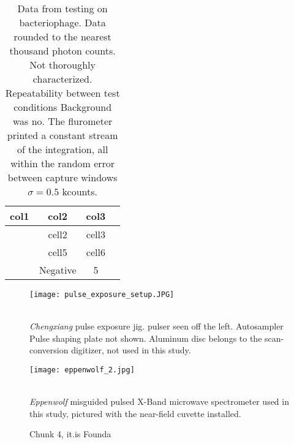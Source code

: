\documentclass[fleqn,10pt]{article}
\begin{document}



\begin{table}[h!]
	\centering
	\begin{tabular}{ |c|c|c|c| } 
		\hline
		col1 & col2 & col3 \\
		\hline
		& cell2 & cell3 \\ 
		& cell5 & cell6 \\ 
		& Negative & 5 \\ 
		\hline
	\end{tabular}

	\caption{Data from testing on bacteriophage. Data rounded to the nearest thousand photon counts. Not thoroughly characterized. Repeatability between test conditions   Background was no. 
	The flurometer printed a constant stream of the integration, all within the random error between capture windows $\sigma=0.5$ kcounts. }
\end{table}


\begin{figure}[H]
	\captionsetup{singlelinecheck = false, justification=justified}
	\centering
	\texttt{[image: pulse\_exposure\_setup.JPG]}
	\caption{\\ \textit{Chengxiang} pulse exposure jig. pulser seen off the left. Autosampler Pulse shaping plate not shown. Aluminum disc belongs to the scan-conversion digitizer, not used in this study.}
\end{figure}
	
\begin{figure}[H]
	\captionsetup{singlelinecheck = false, justification=justified}
	\centering
	\texttt{[image: eppenwolf\_2.jpg]}
	\caption{\\ \textit{Eppenwolf} misguided pulsed X-Band microwave spectrometer used in this study, pictured with the near-field cuvette installed.}
\end{figure}

\clearpage















\begin{figure}[H]
	\caption{Chunk 4, it.is Founda}
\end{figure}
\end{document}
